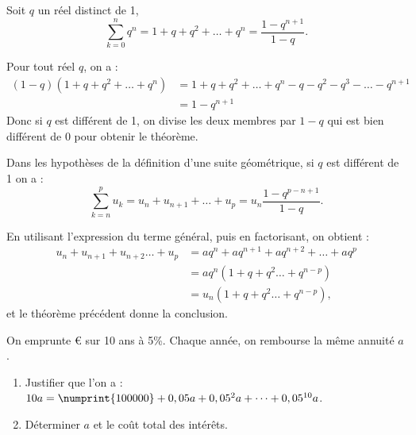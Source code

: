 \documentclass[a4paper,11pt,DIV14,BCOR0mm]{scrartcl}
\begin{document}
\begin{theoreme}
Soit $q$ un réel distinct de 1,
 \[
  \sum_{k=0}^{n}q^n=1+q+q^2+\dots+q^n=\frac{1-q^{n+1}}{1-q}.
 \]
\end{theoreme}
\begin{demonstration}
 Pour tout réel $q$, on a :
\begin{align*}
 (1-q)(1+q+q^2+\dots+q^n)&=1+q+q^2+\dots+q^n-q-q^2-q^3-\dots-q^{n+1}\\
			 &=1-q^{n+1}
\end{align*}
Donc si $q$ est différent de 1, on divise les deux membres par $1-q$
qui est bien différent de 0 pour obtenir le théorème.
\end{demonstration}
\begin{theoreme}
Dans les hypothèses de la définition d'une suite géométrique, si $q$ est différent de 1
on a :
 \[
  \sum_{k=n}^{p}u_k=u_n+u_{n+1}+\dots+u_{p}=u_n\frac{1-q^{p-n+1}}{1-q}.
 \]
\end{theoreme}
\begin{demonstration}
 En utilisant l'expression du terme général, puis en factorisant, on obtient :
\begin{align*}
 u_n+u_{n+1}+u_{n+2}\dots+u_{p}&=aq^n+aq^{n+1}+aq^{n+2}+\dots+aq^p\\
			&=aq^n(1+q+q^2\dots+q^{n-p})\\
			&=u_n(1+q+q^2\dots+q^{n-p}),
\end{align*}
et le théorème précédent donne la conclusion.
\end{demonstration}

\begin{exercice}
 On emprunte \euro{} sur 10 ans à 5\%.
Chaque année, on rembourse la même annuité $a$.
\begin{enumerate}
 \item Justifier que l'on a : $10a=\numprint{100000}+0,05a+0,05^2a+\cdots+0,05^{10}a$.
 \item Déterminer $a$ et le coût total des intérêts.
\end{enumerate}

\end{exercice}

\pagebreak
\end{document}
